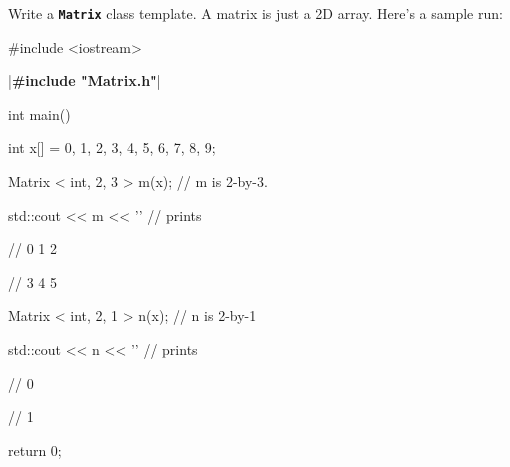 Write a \texttt{\textbf{Matrix}} class template. A matrix is just a 2D array. Here's a sample run:



\begin{consolethree}[escapeinside=||]

#include <iostream>

|\textbf{\#include "Matrix.h"}|



int main()

{    

     int x[] = {0, 1, 2, 3, 4, 5, 6, 7, 8, 9};

     Matrix < int, 2, 3 > m(x); // m is 2-by-3.

     std::cout << m << '\n' // prints

                            // 0 1 2

                            // 3 4 5

     Matrix < int, 2, 1 > n(x); // n is 2-by-1

     std::cout << n << '\n' // prints

                            // 0

                            // 1

    return 0;

} 

\end{consolethree}

